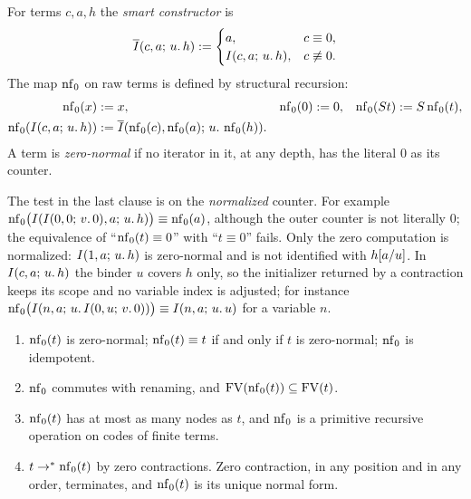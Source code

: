 \begin{definition}
\label{comp:def:nfzero}
For terms $c,a,h$ the \emph{smart constructor} is
\[
 \overline{I}(c,a;\,u.\,h)\mathrel{:=}
 \begin{cases}
  a, & c\equiv0,\\
  I(c,a;\,u.\,h), & c\not\equiv0.
 \end{cases}
\]
The map $\operatorname{nf}_0$ on raw terms is defined by structural recursion:
\begin{align*}
 \operatorname{nf}_0(x)&\mathrel{:=} x, & \operatorname{nf}_0(0)&\mathrel{:=}0, & \operatorname{nf}_0(S t)&\mathrel{:=}S\operatorname{nf}_0(t),\\
 \operatorname{nf}_0(I(c,a;\,u.\,h))&\mathrel{:=}
 \overline{I}(\operatorname{nf}_0(c),\operatorname{nf}_0(a);\,u.\,\operatorname{nf}_0(h)). &&&&
\end{align*}
A term is \emph{zero-normal} if no iterator in it, at any depth, has the
literal $0$ as its counter.
\end{definition}

The test in the last clause is on the \emph{normalized} counter. For
example $\operatorname{nf}_0\bigl(I(I(0,0;\,v.\,0),a;\,u.\,h)\bigr)\equiv\operatorname{nf}_0(a)$,
although the outer counter is not literally $0$; the equivalence of
``$\operatorname{nf}_0(t)\equiv0$'' with ``$t\equiv0$'' fails. Only the zero computation
is normalized: $I(1,a;\,u.\,h)$ is zero-normal and is not identified with
$h[a/u]$. In $I(c,a;\,u.\,h)$ the binder $u$ covers $h$ only, so the
initializer returned by a contraction keeps its scope and no variable index
is adjusted; for instance
$\operatorname{nf}_0\bigl(I(n,a;\,u.\,I(0,u;\,v.\,0))\bigr)\equiv I(n,a;\,u.\,u)$ for a
variable $n$.

\begin{lemma}
\label{comp:lem:nfzero}
\begin{enumerate}[label=(\alph*)]
\item $\operatorname{nf}_0(t)$ is zero-normal; $\operatorname{nf}_0(t)\equiv t$ if and only if $t$ is
 zero-normal; $\operatorname{nf}_0$ is idempotent.
\item $\operatorname{nf}_0$ commutes with renaming, and $\operatorname{FV}(\operatorname{nf}_0(t))\subseteq\operatorname{FV}(t)$.
\item $\operatorname{nf}_0(t)$ has at most as many nodes as $t$, and $\operatorname{nf}_0$ is a
 primitive recursive operation on codes of finite terms.
\item $t\to^{*}\operatorname{nf}_0(t)$ by zero contractions. Zero contraction, in any
 position and in any order, terminates, and $\operatorname{nf}_0(t)$ is its unique normal
 form.
\end{enumerate}
\end{lemma}

